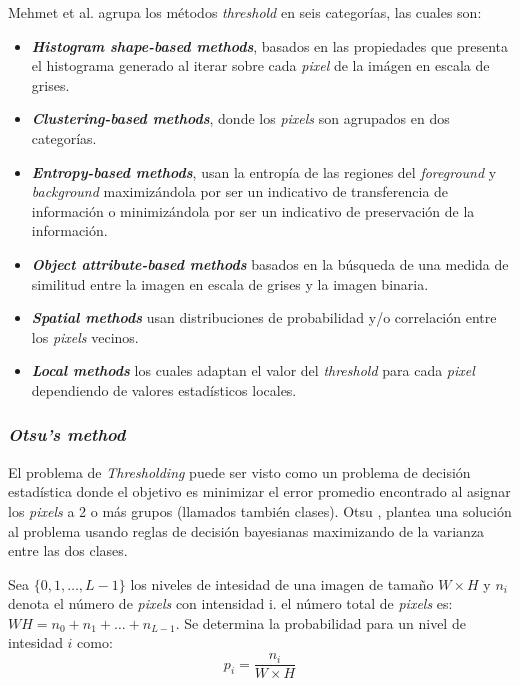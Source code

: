  	Mehmet et al. \cite{Sezgin:2004:Survey} agrupa los métodos 
 	\textit{threshold} en seis categorías, las cuales son:
 	\begin{itemize}
 		\item \textbf{\textit{Histogram shape-based methods}}, basados en las 
 		propiedades que presenta el histograma generado al iterar sobre cada 
 		\textit{pixel} de la imágen en escala de grises.
 		\item \textbf{\textit{Clustering-based methods}}, donde los 
 		\textit{pixels} son agrupados en dos categorías.
 		\item \textbf{\textit{Entropy-based methods}}, usan la entropía de las 
 		regiones del \textit{foreground} y \textit{background} maximizándola por 
 		ser un indicativo de transferencia de información o minimizándola por ser 
 		un indicativo de preservación de la información.
 		\item \textbf{\textit{Object attribute-based methods}} basados en la 
 		búsqueda de una medida de similitud entre la imagen en escala de grises y 
 		la imagen binaria.
 		\item \textbf{\textit{Spatial methods}} usan distribuciones de 
 		probabilidad y/o correlación entre los \textit{pixels} vecinos.
 		\item \textbf{\textit{Local methods}} los cuales adaptan el valor del 
 		\textit{threshold} para cada \textit{pixel} dependiendo de valores 
 		estadísticos locales.
 	\end{itemize}
 	
  \subsubsection{\textit{Otsu's method}}
    El problema de \textit{Thresholding} puede ser visto como un problema de 
    decisión estadística donde el objetivo es minimizar el error promedio 
    encontrado al asignar los \textit{pixels} a 2 o más grupos (llamados 
    también clases). Otsu \cite{Otsu:1979:Threshold}, plantea una solución al 
    problema usando reglas de decisión bayesianas maximizando de la varianza 
    entre las dos clases.

Sea $\{0, 1, \dots, L-1\}$ los niveles de intesidad de una imagen de tamaño 
$W\times H$ y $n_i$ denota el número de \textit{pixels} con intensidad i. el 
número total de \textit{pixels} es: $WH = n_0 + n_1 + \dots + n_{L-1}$. Se 
determina la probabilidad para un nivel de intesidad $i$ como:
\begin{equation}
  p_i = \frac{n_i}{W \times H}
\end{equation}

